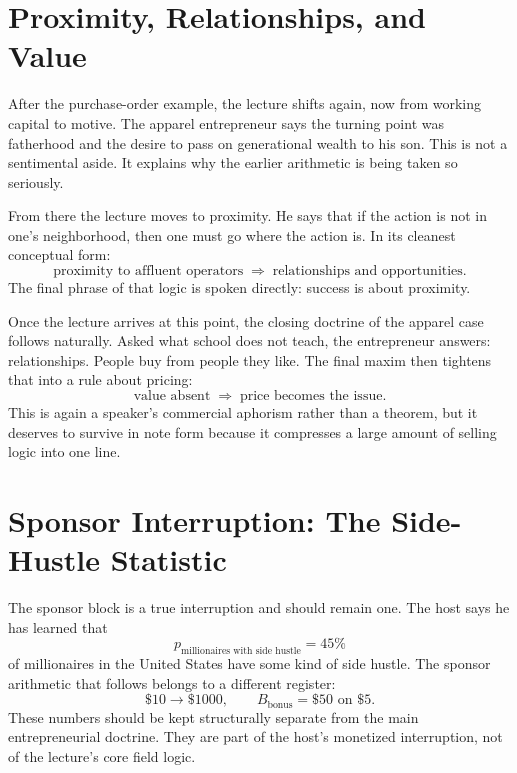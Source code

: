 \section{Proximity, Relationships, and Value}

After the purchase-order example, the lecture shifts again, now from working capital to motive. The apparel entrepreneur says the turning point was fatherhood and the desire to pass on generational wealth to his son. This is not a sentimental aside. It explains why the earlier arithmetic is being taken so seriously.

From there the lecture moves to proximity. He says that if the action is not in one's neighborhood, then one must go where the action is. In its cleanest conceptual form:
\begin{equation}
\text{proximity to affluent operators}
\;\Rightarrow\;
\text{relationships and opportunities}.
\end{equation}
The final phrase of that logic is spoken directly: success is about proximity.

Once the lecture arrives at this point, the closing doctrine of the apparel case follows naturally. Asked what school does not teach, the entrepreneur answers: relationships. People buy from people they like. The final maxim then tightens that into a rule about pricing:
\begin{equation}
\text{value absent} \;\Rightarrow\; \text{price becomes the issue}.
\end{equation}
This is again a speaker's commercial aphorism rather than a theorem, but it deserves to survive in note form because it compresses a large amount of selling logic into one line.

\section{Sponsor Interruption: The Side-Hustle Statistic}

The sponsor block is a true interruption and should remain one. The host says he has learned that
\begin{equation}
p_{\text{millionaires with side hustle}} = 45\%
\end{equation}
of millionaires in the United States have some kind of side hustle. The sponsor arithmetic that follows belongs to a different register:
\begin{equation}
\$10 \to \$1000,\qquad
B_{\text{bonus}} = \$50 \text{ on } \$5.
\end{equation}
These numbers should be kept structurally separate from the main entrepreneurial doctrine. They are part of the host's monetized interruption, not of the lecture's core field logic.


